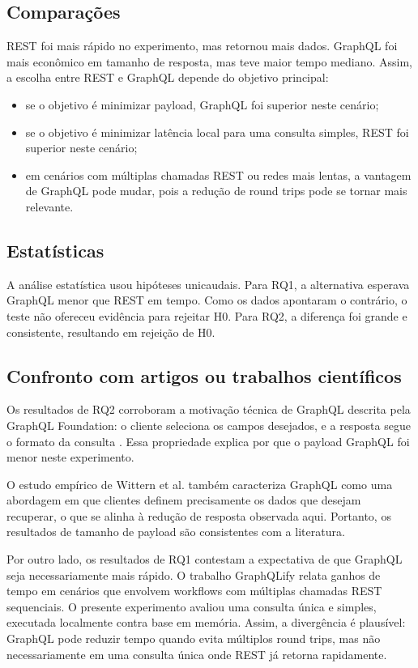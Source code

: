 \documentclass[12pt,a4paper]{article}
\begin{document}
\subsection{Comparações}

REST foi mais rápido no experimento, mas retornou mais dados. GraphQL foi mais econômico em tamanho de resposta, mas teve maior tempo mediano. Assim, a escolha entre REST e GraphQL depende do objetivo principal:

\begin{itemize}
  \item se o objetivo é minimizar payload, GraphQL foi superior neste cenário;
  \item se o objetivo é minimizar latência local para uma consulta simples, REST foi superior neste cenário;
  \item em cenários com múltiplas chamadas REST ou redes mais lentas, a vantagem de GraphQL pode mudar, pois a redução de round trips pode se tornar mais relevante.
\end{itemize}

\subsection{Estatísticas}

A análise estatística usou hipóteses unicaudais. Para RQ1, a alternativa esperava GraphQL menor que REST em tempo. Como os dados apontaram o contrário, o teste não ofereceu evidência para rejeitar H0. Para RQ2, a diferença foi grande e consistente, resultando em rejeição de H0.

\subsection{Confronto com artigos ou trabalhos científicos}

Os resultados de RQ2 corroboram a motivação técnica de GraphQL descrita pela GraphQL Foundation: o cliente seleciona os campos desejados, e a resposta segue o formato da consulta \cite{graphqlqueries2026}. Essa propriedade explica por que o payload GraphQL foi menor neste experimento.

O estudo empírico de Wittern et al. \cite{wittern2019graphqlschemas} também caracteriza GraphQL como uma abordagem em que clientes definem precisamente os dados que desejam recuperar, o que se alinha à redução de resposta observada aqui. Portanto, os resultados de tamanho de payload são consistentes com a literatura.

Por outro lado, os resultados de RQ1 contestam a expectativa de que GraphQL seja necessariamente mais rápido. O trabalho GraphQLify \cite{amareen2026graphqlify} relata ganhos de tempo em cenários que envolvem workflows com múltiplas chamadas REST sequenciais. O presente experimento avaliou uma consulta única e simples, executada localmente contra base em memória. Assim, a divergência é plausível: GraphQL pode reduzir tempo quando evita múltiplos round trips, mas não necessariamente em uma consulta única onde REST já retorna rapidamente.
\end{document}
